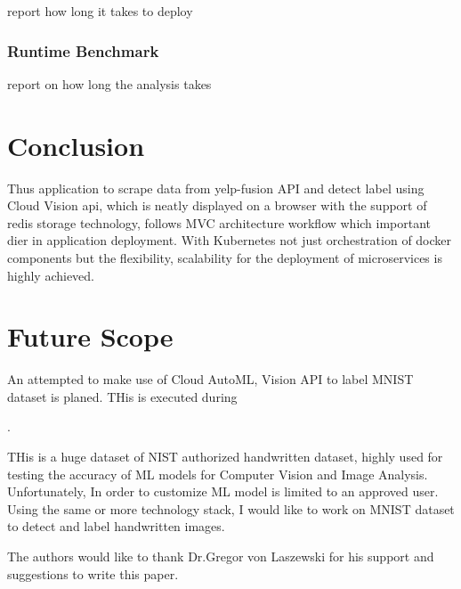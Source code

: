 report how long it takes to deploy

\subsubsection{Runtime Benchmark}

report on how long the analysis takes



\section{Conclusion}

Thus application to scrape data from yelp-fusion API and detect label
using Cloud Vision api, which is neatly displayed on a browser with
the support of redis storage technology, follows MVC architecture
workflow which important dier in application deployment. With
Kubernetes not just orchestration of docker components but the
flexibility, scalability for the deployment of microservices is highly
achieved.
  
\section{Future Scope}


An attempted to make use of Cloud AutoML, Vision API to label MNIST
dataset is planed. THis is executed during 

.

THis is a huge dataset of NIST authorized handwritten
dataset, highly used for testing the accuracy of ML models for
Computer Vision and Image Analysis. Unfortunately, In order to
customize ML model is limited to an approved user. Using the same or
more technology stack, I would like to work on MNIST dataset to detect
and label handwritten images.

\begin{acks}

  The authors would like to thank Dr.Gregor von Laszewski for his
  support and suggestions to write this paper.
  
\end{acks}

 

